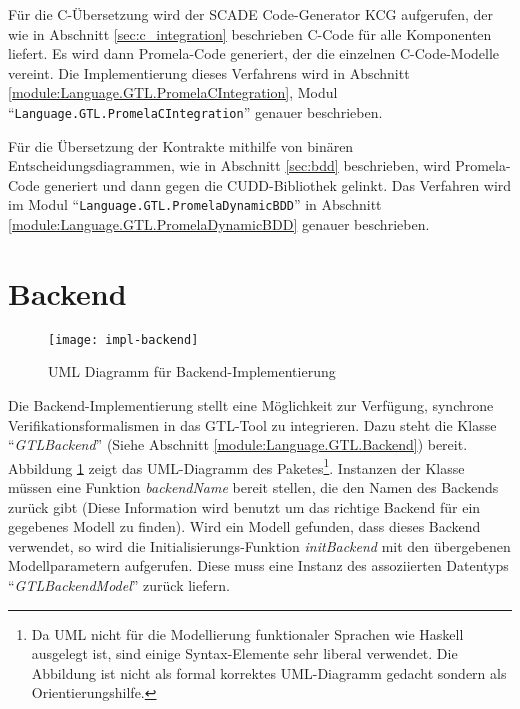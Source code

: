 Für die C-Übersetzung wird der SCADE Code-Generator KCG aufgerufen, der wie in Abschnitt \ref{sec:c_integration} beschrieben C-Code für alle Komponenten liefert.
Es wird dann Promela-Code generiert, der die einzelnen C-Code-Modelle vereint.
Die Implementierung dieses Verfahrens wird in Abschnitt \ref{module:Language.GTL.PromelaCIntegration}, Modul "`\verb|Language.GTL.PromelaCIntegration|"' genauer beschrieben.

Für die Übersetzung der Kontrakte mithilfe von binären Entscheidungsdiagrammen, wie in Abschnitt \ref{sec:bdd} beschrieben, wird Promela-Code generiert und dann gegen die CUDD-Bibliothek gelinkt.
Das Verfahren wird im Modul "`\verb|Language.GTL.PromelaDynamicBDD|"' in Abschnitt \ref{module:Language.GTL.PromelaDynamicBDD} genauer beschrieben.
\section{Backend}
\begin{figure}
  \centering
  \texttt{[image: impl-backend]}
  \caption{UML Diagramm für Backend-Implementierung}
  \label{fig:backend-uml}
\end{figure}
Die Backend-Implementierung stellt eine Möglichkeit zur Verfügung, synchrone Verifikationsformalismen in das GTL-Tool zu integrieren.
Dazu steht die Klasse "`\emph{GTLBackend}"' (Siehe Abschnitt \ref{module:Language.GTL.Backend}) bereit.
Abbildung \ref{fig:backend-uml} zeigt das UML-Diagramm des Paketes\footnote{Da UML nicht für die Modellierung funktionaler Sprachen wie Haskell ausgelegt ist, sind einige Syntax-Elemente sehr liberal verwendet. Die Abbildung ist nicht als formal korrektes UML-Diagramm gedacht sondern als Orientierungshilfe.}.
Instanzen der Klasse müssen eine Funktion \emph{backendName} bereit stellen, die den Namen des Backends zurück gibt (Diese Information wird benutzt um das richtige Backend für ein gegebenes Modell zu finden).
Wird ein Modell gefunden, dass dieses Backend verwendet, so wird die Initialisierungs-Funktion \emph{initBackend} mit den übergebenen Modellparametern aufgerufen.
Diese muss eine Instanz des assoziierten Datentyps "`\emph{GTLBackendModel}"' zurück liefern.

